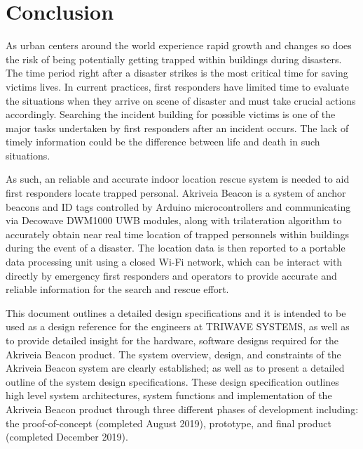 

\setcounter{section}{6}
\section{Conclusion}

\bigskip
As urban centers around the world experience rapid growth and changes so does the risk of being potentially getting trapped within buildings during disasters. The time period right after a disaster strikes is the most critical time for saving victims lives. In current practices, first responders have limited time to evaluate the situations when they arrive on scene of disaster and must take crucial actions accordingly. Searching the incident building for possible victims is one of the major tasks undertaken by first responders after an incident occurs. The lack of timely information could be the difference between life and death in such situations.

\bigskip
As such, an reliable and accurate indoor location rescue system is needed to aid first responders locate trapped personal. Akriveia Beacon is a system of anchor beacons and ID tags controlled by Arduino microcontrollers and communicating via Decowave DWM1000 UWB modules, along with trilateration algorithm to accurately obtain near real time location of trapped personnels within buildings during the event of a disaster. The location data is then reported to a portable data processing unit using a closed Wi-Fi network, which can be interact with directly by emergency first responders and operators to provide accurate and reliable information for the search and rescue effort. 

\bigskip
This document outlines a detailed design specifications and it is intended to be used as a design
reference for the engineers at TRIWAVE SYSTEMS, as well as to provide detailed insight for the hardware, software designs required for the Akriveia Beacon product. The system overview, design, and constraints of the Akriveia Beacon system are clearly established; as well as to present a detailed outline of the system design specifications. These design specification outlines high level system architectures, system functions and implementation of the Akriveia Beacon product through three different phases of development including: the proof-of-concept (completed August 2019), prototype, and final product (completed December 2019).


